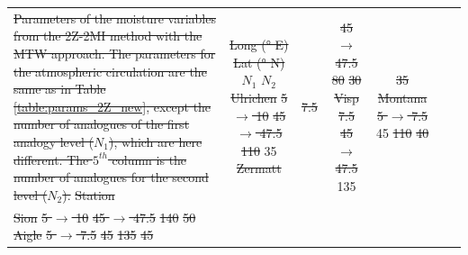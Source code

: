 \documentclass[hess, manuscript]{copernicus}
\providecommand{\DIFadd}[1]{{\protect\color{blue}\uwave{#1}}} %
\providecommand{\DIFdel}[1]{{\protect\color{red}\sout{#1}}}                      %
\providecommand{\DIFaddFL}[1]{\DIFadd{#1}} %
\providecommand{\DIFdelFL}[1]{\DIFdel{#1}} %
\providecommand{\DIFaddbeginFL}{} %
\providecommand{\DIFaddendFL}{} %
\providecommand{\DIFdelbeginFL}{} %
\providecommand{\DIFdelendFL}{} %
\begin{document}
\begin{table}[htb]
\begin{center}
\begin{tabular}{l c c c c c c }
{%
\DIFdelFL{Parameters of the moisture variables from the 2Z-2MI method with the MTW approach. The parameters for the atmospheric circulation are the same as in Table \ref{table:params_2Z_new}, except the number of analogues of the first analogy level ($N_{1}$), which are here different. The $5^{th}$ column is the number of analogues for the second level ($N_{2}$).}}
\DIFdelFL{Station }\DIFdelendFL \DIFaddbeginFL \DIFaddFL{100 }\DIFaddendFL & \DIFdelbeginFL \DIFdelFL{Long (° E) }%
\DIFdelFL{Lat (° N) }%
\DIFdelFL{$N_{1}$ }%
\DIFdelFL{$N_{2}$ }%
\DIFdelFL{Ulrichen }%
\DIFdelFL{5 $\rightarrow$ 10 }%
\DIFdelFL{45 $\rightarrow$ 47.5 }%
\DIFdelFL{110 }%
\DIFdelendFL 35 \DIFdelbeginFL %
\DIFdelFL{Zermatt }\DIFdelendFL & \DIFdelbeginFL \DIFdelFL{7.5 }\DIFdelendFL \DIFaddbeginFL \DIFaddFL{75 }\DIFaddendFL & \DIFdelbeginFL \DIFdelFL{45 $\rightarrow$ 47.5 }%
\DIFdelFL{80 }%
\DIFdelFL{30 }%
\DIFdelFL{Visp }%
\DIFdelFL{7.5 }%
\DIFdelFL{45 $\rightarrow$ 47.5 }%
\DIFdelendFL 135 & \DIFdelbeginFL \DIFdelFL{35 }%
\DIFdelFL{Montana }%
\DIFdelFL{5 $\rightarrow$ 7.5 }%
\DIFdelendFL 45\DIFdelbeginFL %
\DIFdelFL{110 }%
\DIFdelFL{40 }\DIFdelendFL \\ 
				\DIFdelbeginFL \DIFdelFL{Sion }%
\DIFdelFL{5 $\rightarrow$ 10 }%
\DIFdelFL{45 $\rightarrow$ 47.5 }%
\DIFdelFL{140 }%
\DIFdelFL{50 }%
\DIFdelFL{Aigle }%
\DIFdelFL{5 $\rightarrow$ 7.5 }%
\DIFdelFL{45 }%
\DIFdelFL{135 }%
\DIFdelFL{45 }%
\DIFdelendFL \hline
			\end{tabular}
		\end{center}	
		\DIFdelbeginFL %
\DIFdelendFL \DIFaddbeginFL \label{table:analog_nb}
	\DIFaddendFL \end{table}
\end{document}
